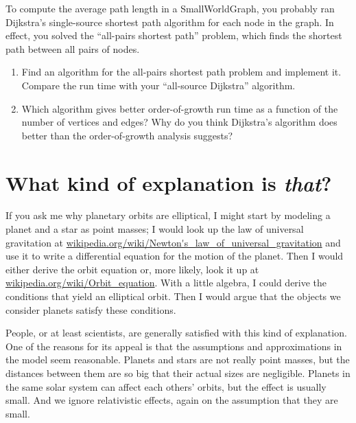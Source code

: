 \documentclass[10pt]{book}
\begin{document}
\begin{ex}

To compute the average path length in a SmallWorldGraph, you
probably ran Dijkstra's single-source shortest path algorithm
for each node in the graph.  In effect, you solved the
``all-pairs shortest path'' problem, which finds the shortest path
between all pairs of nodes.

\begin{enumerate}

\item Find an algorithm for the all-pairs shortest path problem
and implement it.  Compare the run time with your
``all-source Dijkstra'' algorithm.

\item Which algorithm gives better order-of-growth run time
as a function of the number of vertices and edges?  Why do you
think Dijkstra's algorithm does better than the order-of-growth
analysis suggests?

\end{enumerate}

\end{ex}


\section{What kind of explanation is {\em that}?}

If you ask me why planetary orbits are elliptical,
I might start by modeling a planet and a star as point masses; I
would look up the law of universal gravitation at
\url{wikipedia.org/wiki/Newton's_law_of_universal_gravitation}
and use it to write a differential equation for the motion of
the planet.  Then I would either derive the orbit equation or,
more likely, look it up at \url{wikipedia.org/wiki/Orbit_equation}.
With a little algebra, I could derive the conditions that
yield an elliptical orbit.  Then I would argue that the objects
we consider planets satisfy these conditions.

People, or at least scientists, are generally satisfied with
this kind of explanation.  One of the reasons for its appeal
is that the assumptions and approximations in the model seem
reasonable.  Planets and stars are not really point masses,
but the distances between them are so big that their actual
sizes are negligible.  Planets in the same solar system can
affect each others' orbits, but the effect is usually small.
And we ignore relativistic effects, again on the assumption that
they are small.
\end{document}
